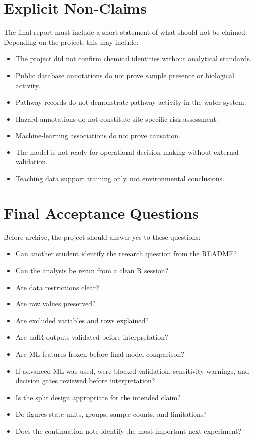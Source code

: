\section{Explicit Non-Claims}

The final report must include a short statement of what should not be claimed. Depending on the project, this may include:
\begin{itemize}
  \item The project did not confirm chemical identities without analytical standards.
  \item Public database annotations do not prove sample presence or biological activity.
  \item Pathway records do not demonstrate pathway activity in the water system.
  \item Hazard annotations do not constitute site-specific risk assessment.
  \item Machine-learning associations do not prove causation.
  \item The model is not ready for operational decision-making without external validation.
  \item Teaching data support training only, not environmental conclusions.
\end{itemize}

\section{Final Acceptance Questions}

Before archive, the project should answer yes to these questions:
\begin{itemize}
  \item Can another student identify the research question from the README?
  \item Can the analysis be rerun from a clean R session?
  \item Are data restrictions clear?
  \item Are raw values preserved?
  \item Are excluded variables and rows explained?
  \item Are uafR outputs validated before interpretation?
  \item Are ML features frozen before final model comparison?
  \item If advanced ML was used, were blocked validation, sensitivity warnings, and decision gates reviewed before interpretation?
  \item Is the split design appropriate for the intended claim?
  \item Do figures state units, groups, sample counts, and limitations?
  \item Does the continuation note identify the most important next experiment?
\end{itemize}
